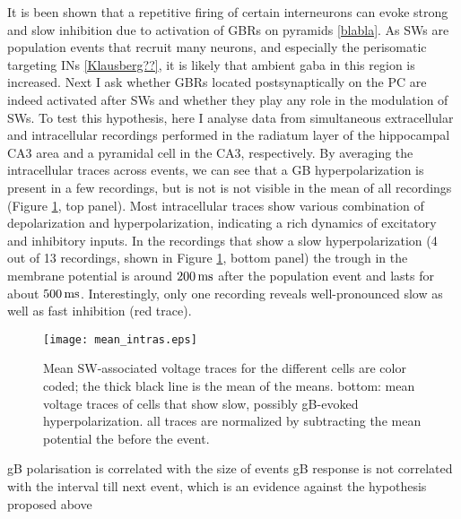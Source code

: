     It is been shown that a repetitive firing of certain interneurons can evoke
    strong and slow inhibition due to activation of GBRs on pyramids
    \ref{blabla}. As SWs are population events that recruit many neurons, and
    especially the perisomatic targeting INs \ref{Klausberg??}, it is likely
    that ambient gaba in this region is increased. Next I ask whether GBRs
    located postsynaptically on the PC are indeed activated after SWs and
    whether they play any role in the modulation of SWs. To test this
    hypothesis, here I analyse data from simultaneous extracellular and
    intracellular recordings performed in the radiatum layer of the hippocampal
    CA3 area and a pyramidal cell in the CA3, respectively. By averaging the
    intracellular traces across events, we can see that a GB hyperpolarization
    is present in a few recordings, but is not is not visible in the mean of
    all recordings (Figure \ref{fig:intra_means}, top panel). Most
    intracellular traces show various combination of depolarization and
    hyperpolarization, indicating a rich dynamics of excitatory and inhibitory
    inputs. In the recordings that show a slow hyperpolarization (4 out of 13
    recordings, shown in Figure \ref{fig:intra_means}, bottom panel) the trough
    in the membrane potential is around $200 \, \rm ms$ after the population
    event and lasts for about $500 \, \rm ms$. Interestingly, only one
    recording reveals well-pronounced slow as well as fast inhibition (red
    trace).

   \begin{figure}
      \texttt{[image: mean\_intras.eps]}
      \caption{ Mean SW-associated voltage traces for the different cells are color coded;
        the thick black line is the mean of the means. bottom: mean voltage traces of
        cells that show slow, possibly gB-evoked hyperpolarization. all
        traces are normalized by subtracting the mean potential the before
        the event.
              }
      \label{fig:intra_means}
    \end{figure}

    gB polarisation is correlated with the size of events
    gB response is not correlated with the interval till next event, which is an evidence against the hypothesis proposed above

